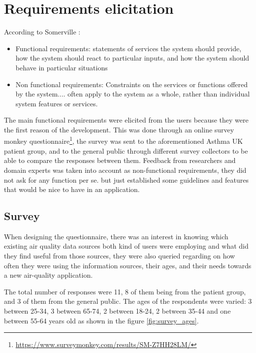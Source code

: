 \section{Requirements elicitation}
According to Somerville \cite{Sommerville2010}:
\begin{displayquote}
\begin{itemize}

\item Functional requirements: statements of services the system should provide, how the system should react to particular inputs, and how the system should behave in particular situations

\item Non functional requirements: Constraints on the services or functions offered by the system.... often apply to the system as a whole, rather than individual system features or services.


\end{itemize}
\end{displayquote}

The main functional requirements were elicited from the users because they were the first reason of the development. This was done through an online survey monkey questionnaire\footnote{\url{https://www.surveymonkey.com/results/SM-Z7HH28LM/}}, the survey was sent to the aforementioned Asthma UK patient group, and to the general public through different survey collectors to be able to compare the responses between them. Feedback from researchers and domain experts was taken into account as non-functional requirements, they did not ask for any function per se. but just established some guidelines and features that would be nice to have in an application. 

\subsection{Survey}

When designing the questionnaire, there was an interest in knowing which existing air quality data sources both kind of users were employing and what did they find useful from those sources, they were also queried regarding on how often they were using the information sources, their ages, and their needs towards a new air-quality application.

The total number of responses were 11, 8 of them being from the patient group, and 3 of them from the general public. The ages of the respondents were varied: 3 between 25-34, 3 between 65-74, 2 between 18-24, 2 between 35-44 and one between 55-64 years old as shown in the figure \ref{fig:survey_ages}. 

